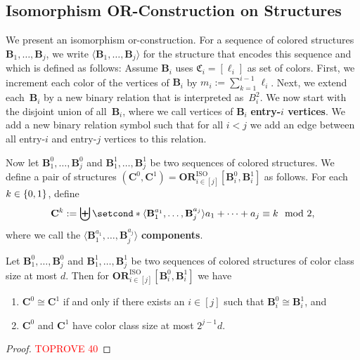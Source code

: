 \documentclass[a4paper,english, thm-restate]{lipics-v2021}
\newcommand{\defining}[1]{\textbf{#1}}
\newcommand{\iso}{\cong}
\newcommand{\bigdisunion}{\biguplus}
\DeclarePairedDelimiter\set{\lbrace}{\rbrace}
\newcommand{\StructB}{\mathbf{B}}
\newcommand{\StructC}{\mathbf{C}}
\newcommand{\colors}{\mathfrak{C}}
\newcommand{\ORISO}[2]{\mathbf{OR}^{\text{ISO}}_{#1}[#2]}
\begin{document}
	
	
	
	\subsection{Isomorphism OR-Construction on Structures}
	
	We present an isomorphism or-construction.
	For a sequence of colored structures $\StructB_1,\dots, \StructB_j$,
	we write $\langle \StructB_1, \dots, \StructB_j \rangle$
	for the structure that encodes this sequence and which is defined as follows:
	Assume $\StructB_i$ uses $\colors_i = [\ell_i]$ as set of colors.
	First, we increment each color of the vertices of $\StructB_i$ by $m_i := \sum_{k=1}^{i-1} \ell_i$.
	Next, we extend each~$\StructB_i$ by a new binary relation
	that is interpreted as~$B_i^2$.
	We now start with the disjoint union of all~$\StructB_i$,
	where we call vertices of $\StructB_i$ \defining{entry-$i$ vertices}.
	We add a new binary relation symbol
	such that for all $i <j$ we add an edge
	between all entry-$i$ and entry-$j$ vertices to this relation.
	
	
	Now let $\StructB_1^0, \dots, \StructB_j^0$ and $\StructB_1^1,\dots, \StructB_j^1$
	be two sequences of colored structures.
	We define a pair of structures $(\StructC^0, \StructC^1) = \ORISO{i\in[j]} {\StructB_i^0,\StructB_i^1}$ as follows.
	For each $k \in \set{0,1}$, define
	\[\StructC^k := \bigdisunion \setcond*{\langle \StructB_1^{a_1}, \dots, \StructB_j^{a_j} \rangle}{a_1+\dots+a_j \equiv k \mod 2},\]
	where we call the $\langle \StructB_1^{a_1}, \dots, \StructB_j^{a_j} \rangle$ \defining{components}.
	\begin{lemma}
		\label{lem:or-construction-basics}
		Let $\StructB_1^0, \dots, \StructB_j^0$ and $\StructB_1^1,\dots, \StructB_j^1$
		be two sequences of colored structures of color class size at most $d$.
		Then for $\ORISO{i\in[j]} {\StructB_i^0,\StructB_i^1}$ we have
		\begin{enumerate}
			\item $\StructC^0 \iso \StructC^1$ if and only if there exists an $i \in [j]$ such that $\StructB_i^0 \iso \StructB_i^1$, and
			\item $\StructC^0$ and $\StructC^1$ have color class size at most $2^{j-1}d$.
		\end{enumerate}
	\end{lemma}
	\begin{proof}\textcolor{red}{TOPROVE 40}\end{proof}
	
	
	
\end{document}
